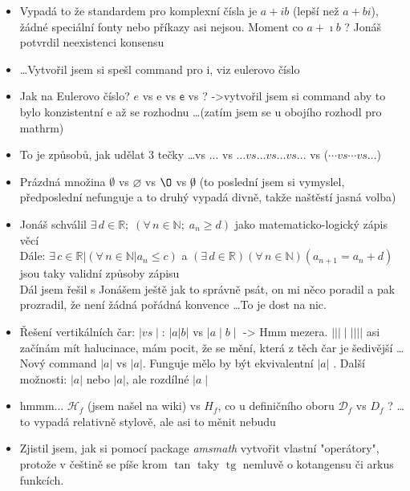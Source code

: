 \documentclass[12pt]{article}
\providecommand{\abs}[1]{\lvert#1\rvert}
\newcommand{\absb}[1]{\lvert#1\rvert}
\newcommand{\euler}{\mathrm{e}} %
\newcommand{\iu}{\mathrm{i}} %
\DeclareMathOperator{\tg}{tg}
\begin{document}
\begin{itemize}
\item Vypadá to že standardem pro komplexní čísla je $a +ib$ (lepší než $a +bi$), žádné speciální fonty nebo příkazy asi nejsou. Moment co $a +\imath b$ ?  Jonáš potvrdil neexistenci konsensu
\item \dots Vytvořil jsem si spešl command pro $\iu$, viz eulerovo číslo
\item Jak na Eulerovo číslo? $e$ vs $\mathrm{e}$ vs $\mathsf{e}$ vs ?  ->vytvořil jsem si command aby to bylo konzistentní $\euler$ až se rozhodnu \dots (zatím jsem se u obojího rozhodl pro mathrm)
\item  To je způsobů, jak udělat 3 tečky \dots vs ... vs $ \dots vs \ldots vs \dotsc vs ...$ vs ($\dotsm vs \dotsb vs \dotso $)
\item Prázdná množina $\emptyset$ vs $\varnothing$ vs $\O$ vs $\not 0$ (to poslední jsem si vymyslel, předposlední nefunguje a to druhý vypadá divně, takže naštěstí jasná volba)
\item Jonáš schválil $\exists \, d \in \mathbb{R}; \; \left( \forall \, n \in \mathbb{N}; \; a_n \geq d \right)$ jako matematicko-logický zápis věcí\\
 Dále:  $\exists \, c \in \mathbb{R} | \left( \forall \, n \in \mathbb{N} | a_n \leq c \right) $ a $\left( \exists \, d \in \mathbb{R} \right) \left( \forall \, n \in \mathbb{N} \right) \left( a_{n+1} = a_n + d \right)$ jsou taky validní způsoby zápisu \\
 Dál jsem řešil s Jonášem ještě jak to správně psát, on mi něco poradil a pak prozradil, že není žádná pořádná konvence \dots To je dost na nic.
\item Řešení vertikálních čar: $| vs \mid$: $| a |b|$ vs $\mid a\mid b\mid$ -> Hmm mezera. $\mid | \mid \mid \mid |||$ asi začínám mít halucinace, mám pocit, že se mění, která z těch čar je šedivější \dots \\
Nový command $\abs{a}$ vs $\absb{a}$. Funguje mělo by být ekvivalentní $\lvert a \rvert$ . Další možnosti: $ \vert a \vert$ nebo $|a|$, ale rozdílné $ \mid a \mid$
\item hmmm... $ \mathcal {H}_{f}$ (jsem našel na wiki) vs $H_f$, co u definičního oboru $\mathcal{D}_f$ vs $D_f$ ? \dots to vypadá relativně stylově, ale asi to měnit nebudu
\item Zjistil jsem, jak si pomocí package \emph{amsmath} vytvořit vlastní "operátory", protože v češtině se píše krom $\tan$ taky $\tg$ nemluvě o kotangensu či arkus funkcích. %

\end{itemize}
\end{document}
